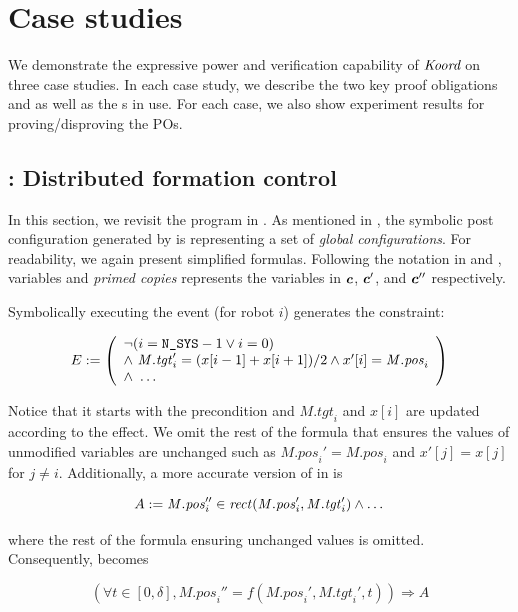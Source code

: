 \section{Case studies}
\label{cases}
We demonstrate the expressive power and verification capability  of $\emph{Koord}$ on three case studies.
In each case study, we describe the two key  proof obligations  and 
as well as the \portasum{}s in use. For each case, we also show experiment results for proving/disproving the POs.


\subsection{\LineForm: Distributed formation control}

\newcommand{\Mposi}{\mathit{M.pos}_i}
\newcommand{\Mtgti}{\mathit{M.tgt}_i}

In this section, we revisit the \LineForm program in .
As mentioned in , the symbolic post configuration generated by \K is representing a set of \emph{global configurations}.
For readability, we again present simplified formulas.
Following the notation in  and ,
variables and \emph{primed copies} represents the variables in $\mathit{\boldsymbol{c}}$, $\mathit{\boldsymbol{c}}'$, and $\mathit{\boldsymbol{c}}''$ respectively.

Symbolically executing the event  (for robot $i$) generates the constraint:
\begin{small}
\[
E :=
\left(
\begin{array}{l}
    \neg (i = \NMAX - 1 \lor i = 0) \\
    \land\ \Mtgti' = (x[i-1] + x[i+1])/2 \land x'[i] = \Mposi \\
    \land\ \dots
\end{array}
\right)
\]
\end{small}%
Notice that it starts with the precondition and $\Mtgti$ and $x[i]$ are updated according to the effect.
We omit the rest of the formula that ensures the values of unmodified variables are unchanged
such as $\Mposi'=\Mposi$ and $x'[j]=x[j]$ for $j\neq i$.
Additionally, a more accurate version of  in  is
\begin{assumption}
\[
    A := \Mposi'' \in \rect(\Mposi', \Mtgti') \land \dots
\]
\end{assumption}
\noindent where the rest of the formula ensuring unchanged values is omitted.
Consequently,  becomes
\begin{proofob}
\[
(\forall t \in [0,\delta], \Mposi'' = f(\Mposi', \Mtgti', t)) \Rightarrow A
\]
\end{proofob}

